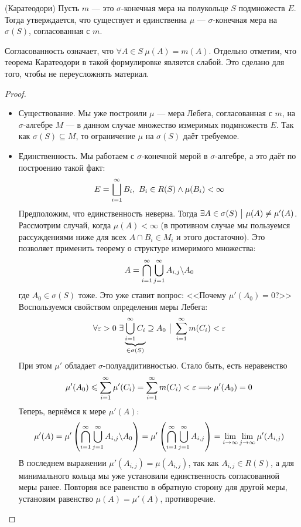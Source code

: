 \begin{theorem} (Каратеодори)
	Пусть $m$ --- это $\sigma$-конечная мера  на полукольце $S$ подмножеств $E$. Тогда утверждается, что существует и единственна $\mu$ --- $\sigma$-конечная мера на $\sigma(S)$, согласованная с $m$.
\end{theorem}

\begin{note}
	Согласованность означает, что $\forall A \in S\ \mu(A) = m(A)$. Отдельно отметим, что теорема Каратеодори в такой формулировке является слабой. Это сделано для того, чтобы не переусложнять материал.
\end{note}

\begin{proof}~
	\begin{itemize}
		\item Существование. Мы уже построили $\mu$ --- мера Лебега, согласованная с $m$, на $\sigma$-алгебре $M$ --- в данном случае множество измеримых подмножеств $E$. Так как $\sigma(S) \subseteq M$, то ограничение $\mu$ на $\sigma(S)$ даёт требуемое.
		
		\item Единственность. Мы работаем с $\sigma$-конечной мерой в $\sigma$-алгебре, а это даёт по построению такой факт:
		\[
			E = \bigsqcup_{i = 1}^\infty B_i,\ B_i \in R(S) \wedge \mu(B_i) < \infty
		\]
		Предположим, что единственность неверна. Тогда $\exists A \in \sigma(S) \ \big|\  \mu(A) \neq \mu'(A)$. Рассмотрим случай, когда $\mu(A) < \infty$ (в противном случае мы пользуемся рассуждениями ниже для всех $A \cap B_i \in M_i$ и этого достаточно). Это позволяет применить теорему о структуре измеримого множества:
		\[
			A = \bigcap_{i = 1}^\infty \bigcup_{j = 1}^\infty A_{i, j} \backslash A_0
		\]
		где $A_0 \in \sigma(S)$ тоже. Это уже ставит вопрос: <<Почему $\mu'(A_0) = 0$?>> Воспользуемся свойством определения меры Лебега:
		\[
			\forall \varepsilon > 0\ \exists \underbrace{\bigcup_{i = 1}^\infty C_i}_{\in \sigma(S)} \supseteq A_0 \ \big|\  \sum_{i = 1}^\infty m(C_i) < \varepsilon
		\]
		При этом $\mu'$ обладает $\sigma$-полуаддитивностью. Стало быть, есть неравенство
		\[
			\mu'(A_0) \leqslant \sum_{i = 1}^\infty \mu'(C_i) = \sum_{i = 1}^\infty m(C_i) < \varepsilon \Longrightarrow \mu'(A_0) = 0
		\]
		Теперь, вернёмся к мере $\mu'(A)$:
		\[
			\mu'(A) = \mu'\left(\bigcap_{i = 1}^\infty \bigcup_{j = 1}^\infty A_{i, j} \backslash A_0\right) = \mu'\left(\bigcap_{i = 1}^\infty \bigcup_{j = 1}^\infty A_{i, j}\right) = \lim_{i \to \infty} \lim_{j \to \infty} \mu'(A_{i, j})
		\]
		В последнем выражении $\mu'(A_{i, j}) = \mu(A_{i, j})$, так как $A_{i, j} \in R(S)$, а для минимального кольца мы уже установили единственность согласованной меры ранее. Повторяя все равенство в обратную сторону для другой меры, установим равенство $\mu(A) = \mu'(A)$, противоречие.
	\end{itemize}
\end{proof}